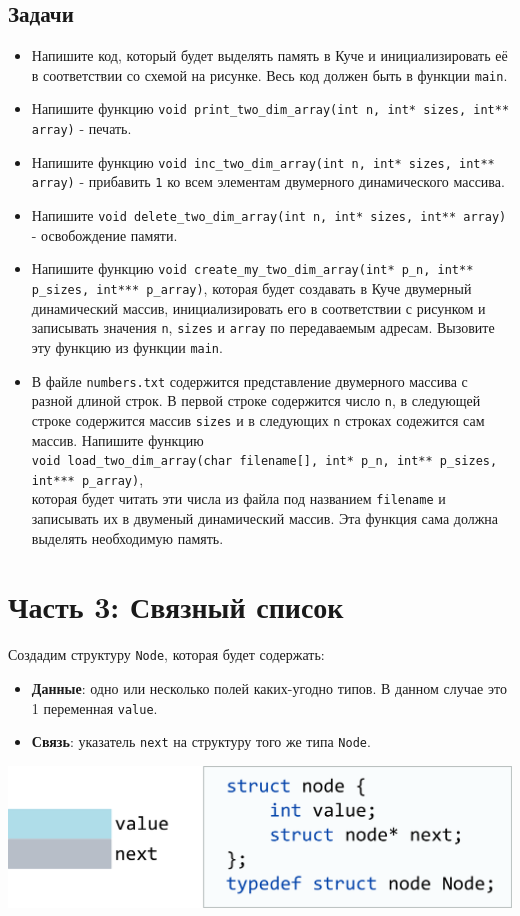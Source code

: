\documentclass{article}
\begin{document}
\subsection*{Задачи}
\begin{itemize}


\item Напишите код, который будет выделять память в Куче и инициализировать её в соответствии со схемой на рисунке. Весь код должен быть в функции \texttt{main}.
\item Напишите функцию \texttt{void print\_two\_dim\_array(int n, int* sizes, int** array)} - печать.
\item Напишите функцию \texttt{void inc\_two\_dim\_array(int n, int* sizes, int** array)} - прибавить \texttt{1} ко всем элементам двумерного динамического массива.
\item Напишите \texttt{void delete\_two\_dim\_array(int n, int* sizes, int** array)} - освобождение памяти.
\item Напишите функцию \texttt{void create\_my\_two\_dim\_array(int* p\_n, int** p\_sizes, int*** p\_array)}, которая будет создавать в Куче двумерный динамический массив, инициализировать его в соответствии с рисунком и записывать значения \texttt{n}, \texttt{sizes} и \texttt{array} по передаваемым адресам. Вызовите эту функцию из функции \texttt{main}.
\item В файле \texttt{numbers.txt} содержится представление двумерного массива с разной длиной строк. В первой строке содержится число \texttt{n}, в следующей строке содержится массив \texttt{sizes} и в следующих \texttt{n} строках содежится сам массив. Напишите функцию\\
\texttt{void load\_two\_dim\_array(char filename[], int* p\_n, int** p\_sizes, int*** p\_array)}, \\
которая будет читать эти числа из файла под названием \texttt{filename} и записывать их в двуменый динамический массив. Эта функция сама должна выделять необходимую память.

\end{itemize}
\newpage
\section*{Часть 3: Связный список}
Создадим структуру \texttt{Node}, которая будет содержать:
\begin{itemize}
\item \textbf{Данные}: одно или несколько полей каких-угодно типов. В данном случае это 1 переменная \texttt{value}.
\item \textbf{Связь}: указатель \texttt{next} на структуру того же типа \texttt{Node}.
\end{itemize}
\begin{center}
\includegraphics[scale=0.8]{../images/structlist.png}
\end{center}
\end{document}
